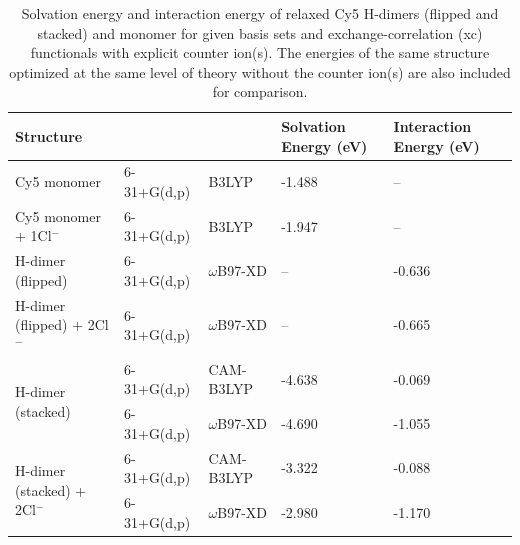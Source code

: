 \begin{table}[h]
\centering
\caption{Solvation energy and interaction energy of relaxed Cy5 H-dimers (flipped and stacked) and monomer for given basis sets and exchange-correlation (xc) functionals with explicit counter ion(s). The energies of the same structure optimized at the same level of theory without the counter ion(s) are also included for comparison.} \label{tab:cl-energies}
\begin{tabular}{|lll|p{15mm}|p{20mm}|}
\hline
\multicolumn{3}{|l|}{Structure}                                        & Solvation Energy (eV) & Interaction Energy (eV) \\ \hline
\multicolumn{1}{|l|}{Cy5 monomer}                & \multicolumn{1}{l|}{6-31+G(d,p)} & B3LYP   & -1.488        & --           \\ \hline
\multicolumn{1}{|l|}{Cy5 monomer + 1Cl$^{-}$}            & \multicolumn{1}{l|}{6-31+G(d,p)} & B3LYP   & -1.947        & --           \\ \hline
\multicolumn{1}{|l|}{H-dimer (flipped)}             & \multicolumn{1}{l|}{6-31+G(d,p)} & $\omega$B97-XD  & --          & -0.636         \\ \hline
\multicolumn{1}{|l|}{H-dimer (flipped) + 2Cl$^{-}$}         & \multicolumn{1}{l|}{6-31+G(d,p)} & $\omega$B97-XD  & --          & -0.665         \\ \hline
\multicolumn{1}{|l|}{\multirow{2}{*}{H-dimer (stacked)}}    & \multicolumn{1}{l|}{6-31+G(d,p)} & CAM-B3LYP & -4.638        & -0.069         \\ \cline{2-5} 
\multicolumn{1}{|l|}{}                     & \multicolumn{1}{l|}{6-31+G(d,p)} & $\omega$B97-XD  & -4.690        & -1.055         \\ \hline
\multicolumn{1}{|l|}{\multirow{2}{*}{H-dimer (stacked) + 2Cl$^{-}$}} & \multicolumn{1}{l|}{6-31+G(d,p)} & CAM-B3LYP & -3.322        & -0.088         \\ \cline{2-5} 
\multicolumn{1}{|l|}{}                     & \multicolumn{1}{l|}{6-31+G(d,p)} & $\omega$B97-XD  & -2.980        & -1.170         \\ \hline
\end{tabular}
\end{table}

